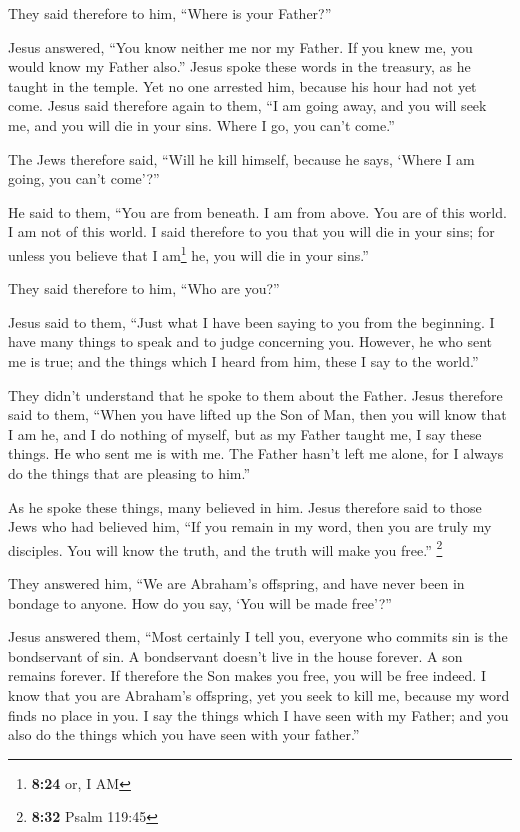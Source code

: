  They said therefore to him, ``Where is your Father?''

Jesus answered, ``You know neither me nor my Father. If you knew me, you
would know my Father also.''  Jesus spoke these words in
the treasury, as he taught in the temple. Yet no one arrested him,
because his hour had not yet come.  Jesus said therefore
again to them, ``I am going away, and you will seek me, and you will die
in your sins. Where I go, you can't come.''

 The Jews therefore said, ``Will he kill himself, because
he says, `Where I am going, you can't come'?''

 He said to them, ``You are from beneath. I am from
above. You are of this world. I am not of this world.  I
said therefore to you that you will die in your sins; for unless you
believe that I am\footnote{\textbf{8:24} or, I AM} he, you will die in
your sins.''

 They said therefore to him, ``Who are you?''

Jesus said to them, ``Just what I have been saying to you from the
beginning.  I have many things to speak and to judge
concerning you. However, he who sent me is true; and the things which I
heard from him, these I say to the world.''

 They didn't understand that he spoke to them about the
Father.  Jesus therefore said to them, ``When you have
lifted up the Son of Man, then you will know that I am he, and I do
nothing of myself, but as my Father taught me, I say these things.
 He who sent me is with me. The Father hasn't left me
alone, for I always do the things that are pleasing to him.''

 As he spoke these things, many believed in him.
 Jesus therefore said to those Jews who had believed him,
``If you remain in my word, then you are truly my disciples.
 You will know the truth, and the truth will make you
free.'' \footnote{\textbf{8:32} Psalm 119:45}

 They answered him, ``We are Abraham's offspring, and
have never been in bondage to anyone. How do you say, `You will be made
free'?''

 Jesus answered them, ``Most certainly I tell you,
everyone who commits sin is the bondservant of sin.  A
bondservant doesn't live in the house forever. A son remains forever.
 If therefore the Son makes you free, you will be free
indeed.  I know that you are Abraham's offspring, yet you
seek to kill me, because my word finds no place in you. 
I say the things which I have seen with my Father; and you also do the
things which you have seen with your father.''


